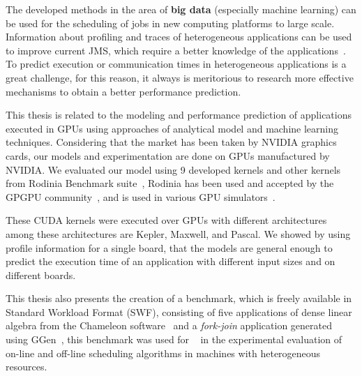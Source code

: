 
The developed methods in the area of \textbf{big data} (especially machine learning) can be used for the scheduling of jobs in new computing platforms to large scale. Information about profiling and traces of heterogeneous applications can be used to improve current JMS, which require a better knowledge of the applications~\citep{JMR:Ruiz:2014}. To predict execution or communication times in heterogeneous applications is a great challenge, for this reason, it always is meritorious to research more effective mechanisms to obtain a better performance prediction.

This thesis is related to the modeling and performance prediction of applications executed in GPUs using approaches of analytical model and machine learning techniques. Considering that the market has been taken by NVIDIA graphics cards, our models and experimentation are done on GPUs manufactured by NVIDIA. We evaluated our model using 9 developed kernels and other kernels from Rodinia Benchmark suite~\citep{Rodinia:Che:2009}, Rodinia has been used and accepted by the GPGPU community~\citep{che:2010:Rodinia, nagasaka:2010:Rodinia}, and is used in various GPU simulators~\citep{power:2014:gem5-gpu}.

These CUDA kernels were executed over GPUs with different architectures among these architectures are Kepler, Maxwell, and Pascal. We showed by using profile information for a single board, that the models are general enough to predict the execution time of an application with different input sizes and on different boards.

This thesis also presents the creation of a benchmark, which is freely available in Standard Workload Format (SWF), consisting of five applications of dense linear algebra from the Chameleon software~\citep{agullo2012morse} and a \emph{fork-join} application generated using GGen~\citep{GGen:simutools10}, this benchmark was used for ~\cite{mommessin:2017, mommesin:2017:CCPE} in the experimental evaluation of on-line and off-line scheduling algorithms in machines with heterogeneous resources. 

